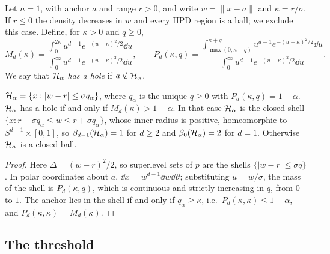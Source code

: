 Let $n = 1$, with anchor $a$ and range $r > 0$, and write $w = \|x - a\|$ and $\kappa = r/\sigma$. If $r \le 0$ the
density decreases in $w$ and every HPD region is a ball; we exclude this case. Define, for $\kappa > 0$ and $q \ge 0$,
\[ M_d(\kappa) = \frac{\int_0^{2\kappa} u^{d-1} e^{-(u-\kappa)^2/2}\dd u}{\int_0^{\infty} u^{d-1} e^{-(u-\kappa)^2/2}\dd u},
   \qquad
   P_d(\kappa, q) = \frac{\int_{\max(0,\kappa-q)}^{\kappa+q} u^{d-1} e^{-(u-\kappa)^2/2}\dd u}{\int_0^{\infty} u^{d-1} e^{-(u-\kappa)^2/2}\dd u}. \]
We say that $\mathcal{H}_\alpha$ \emph{has a hole} if $a \notin \mathcal{H}_\alpha$.

\begin{lemma}[Shells]\label{lem:shell}
$\mathcal{H}_\alpha = \{x : |w - r| \le \sigma q_\alpha\}$, where $q_\alpha$ is the unique $q \ge 0$ with $P_d(\kappa, q) = 1 - \alpha$.
$\mathcal{H}_\alpha$ has a hole if and only if $M_d(\kappa) > 1 - \alpha$. In that case $\mathcal{H}_\alpha$ is the closed shell
$\{x : r - \sigma q_\alpha \le w \le r + \sigma q_\alpha\}$, whose inner radius is positive, homeomorphic to $S^{d-1} \times [0,1]$, so
$\beta_{d-1}(\mathcal{H}_\alpha) = 1$ for $d \ge 2$ and $\beta_0(\mathcal{H}_\alpha) = 2$ for $d = 1$. Otherwise $\mathcal{H}_\alpha$ is a closed ball.
\end{lemma}

\begin{proof}
Here $\Delta = (w - r)^2/2$, so superlevel sets of $p$ are the shells $\{|w - r| \le \sigma q\}$. In polar coordinates about
$a$, $\dd x = w^{d-1}\dd w\dd\vartheta$; substituting $u = w/\sigma$, the mass of the shell is $P_d(\kappa, q)$, which is
continuous and strictly increasing in $q$, from $0$ to $1$. The anchor lies in the shell if and only if
$q_\alpha \ge \kappa$, i.e.\ $P_d(\kappa,\kappa) \le 1 - \alpha$, and $P_d(\kappa,\kappa) = M_d(\kappa)$.
\end{proof}

\subsection{The threshold}

